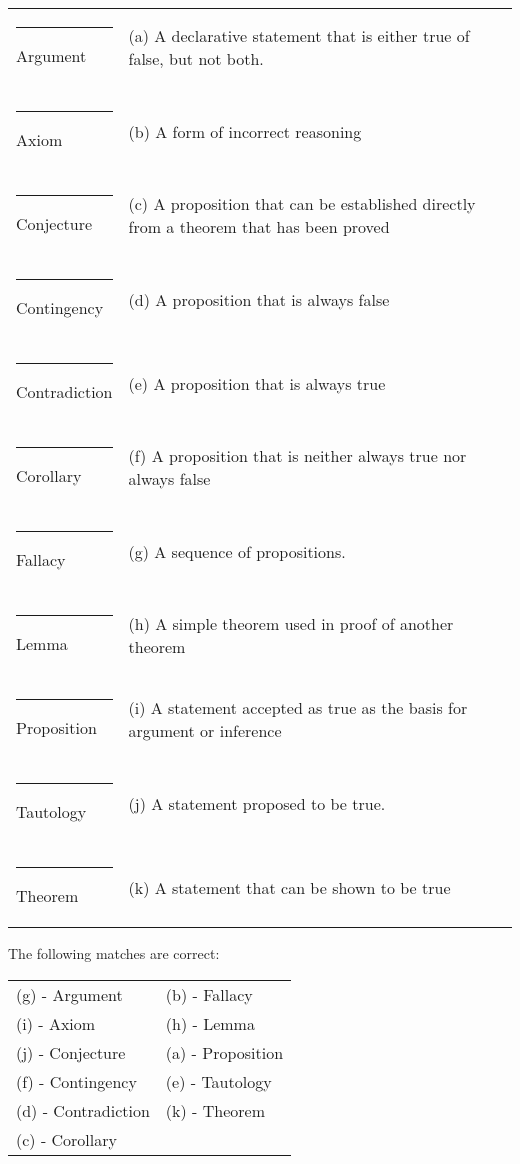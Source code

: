 \documentclass[12pt,addpoints]{exam}
\begin{document}
\begin{questions}
\footnotesize
\begin{tabular}{p{1.8in}p{3.9in}}
\rule{0.7in}{.01in} Argument    & (a) A declarative statement that
is either true of false, but not both.\\
&\\[9pt]
\rule{0.7in}{.01in} Axiom       & (b) A form of incorrect reasoning\\
&\\[9pt]
\rule{0.7in}{.01in} Conjecture  & (c) A proposition that can be
established directly from a theorem that has been proved\\
&\\[9pt]
\rule{0.7in}{.01in} Contingency & (d) A proposition that is always false\\
&\\[9pt]
\rule{0.7in}{.01in} Contradiction & (e) A proposition that is always true\\
&\\[9pt]
\rule{0.7in}{.01in} Corollary   & (f) A proposition that is neither
always true nor always false\\
&\\[9pt]
\rule{0.7in}{.01in} Fallacy     & (g) A sequence of propositions.\\
&\\[9pt]
\rule{0.7in}{.01in} Lemma       & (h) A simple theorem used in proof of another theorem\\
&\\[9pt]
\rule{0.7in}{.01in} Proposition & (i) A statement accepted as true
as the basis for argument or inference\\
&\\[9pt]
\rule{0.7in}{.01in} Tautology   & (j) A statement proposed to be
true.\\
&\\[9pt]
\rule{0.7in}{.01in} Theorem     & (k) A statement that can be shown to be true\\
\end{tabular}
\normalsize
    \ifprintanswers
        \vspace{-10pt}
    \fi
\begin{solution}
    The following matches are correct:

    \begin{tabular}{ll}
        (g) - Argument      & (b) - Fallacy \\
        (i) - Axiom         & (h) - Lemma  \\
        (j) - Conjecture    & (a) - Proposition \\
        (f) - Contingency   & (e) - Tautology \\
        (d) - Contradiction & (k) - Theorem \\
        (c) - Corollary     & \\
    \end{tabular}
\end{solution}



\end{questions}
\end{document}
